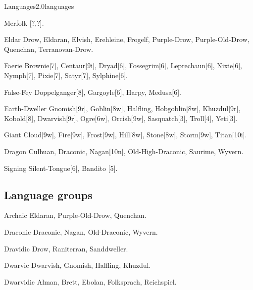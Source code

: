 \begin{skill}{Languages}{2.0}{languages}
\begin{Description}
\item[Merfolk] [?,?].

\item[Eldar] Drow\-[9e], Eldaran\-[10d], Elv\-ish\-[10e], Ereh\-leine\-[10*],
Frog\-elf\-[8*], Purple-Drow\-[9e], Purple-Old-Drow\-[9e], Quenchan\-[10*],
Terra\-novan-Drow\-[9*].

\item[Faerie] Brownie[7], Centaur[9i], Dryad[6], Fossegrim[6],
Leprechaun[6], Nixie[6], Nymph[7], Pixie[7], Satyr[7], Sylphine[6].

\item[False-Fey] Doppel\-ganger[8], Gargoyle[6], Harpy\-[7], Medusa[6].

\item[Earth-Dweller] Gnomish[9r], Goblin[8w], Half\-ling\-[9r],
Hob\-goblin[8w], Khuzdul[9r], Kobold[8], Dwarv\-ish[9r], Ogre[6w],
Orcish[9w], Sasquatch[3], Troll[4], Yeti[3].

\item[Giant] Cloud[9w], Fire[9w], Frost[9w], Hill[8w], Stone[8w],
Storm[9w], Titan[10i].

\item[Dragon] Culhuan\-[10*], Draconic\-[10d], Nagan[10n],
Old-High-Draconic\-[10d], Saurime\-[7d], Wyvern\-[4].

\item[Signing] Silent-Tongue[6], Bandito [5].

\end{Description}

\subsection{Language groups}
\label{languages:groups}

\begin{Description}

\item[Archaic] Eldaran, Purple-Old-Drow, Quenchan.

\item[Draconic] Draconic, Nagan, Old-Draconic, Wyvern.

\item[Dravidic] Drow, Raniterran, Sanddweller.

\item[Dwarvic] Dwarvish, Gnomish, Halfling, Khuzdul.

\item[Dwarvidic] Alman, Brett, Ebolan, Folksprach, Reichspiel.


\end{Description}
\end{skill}
